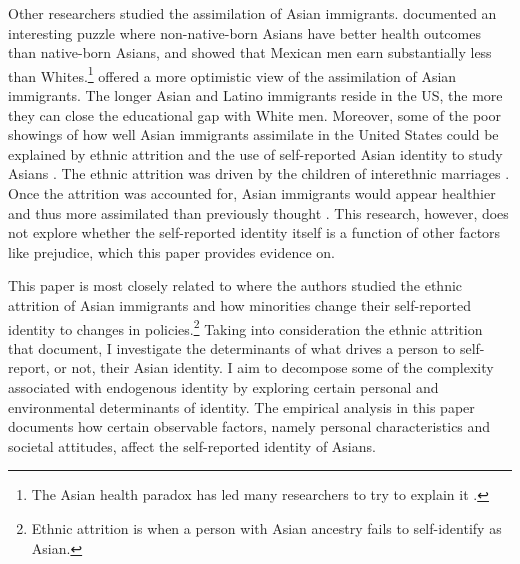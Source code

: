 Other researchers studied the assimilation of Asian immigrants. \textcite{antecolUnhealthyAssimilationWhy2006} documented an interesting puzzle where non-native-born Asians have better health outcomes than native-born Asians, and \textcite{trejoWhyMexicanAmericans1997} showed that Mexican men earn substantially less than Whites.\footnote{The Asian health paradox has led many researchers to try to explain it \autocite{giuntellaAssimilationHealthEvidence2016,giuntellaAccelerationImmigrantUnhealthy2017,giuntellaReasonImmigrationImmigrants2018,giuntellaWhyDoesHealth2017a,antmanEthnicAttritionObserved2016,antmanEthnicAttritionAssimilation2020}.} \textcite{smithAssimilationLatinoGenerations2003} offered a more optimistic view of the assimilation of Asian immigrants. The longer Asian and Latino immigrants reside in the US, the more they can close the educational gap with White men. Moreover, some of the poor showings of how well Asian immigrants assimilate in the United States could be explained by ethnic attrition and the use of self-reported Asian identity to study Asians \autocite{duncanComplexityImmigrantGenerations2017,duncanWhoRemainsMexican2011,mengIntermarriageEconomicAssimilation2005,duncanIdentifyingLaterGenerationDescendants2018,duncanSocioeconomicIntegrationImmigrant2018,antmanEthnicAttritionObserved2016,antmanEthnicAttritionAssimilation2020}. The ethnic attrition was driven by the children of interethnic marriages \autocite{mengIntermarriageEconomicAssimilation2005,duncanEthnicIdentificationIntermarriage2005}. Once the attrition was accounted for, Asian immigrants would appear healthier and thus more assimilated than previously thought \autocite{antmanEthnicAttritionObserved2016,antmanEthnicAttritionAssimilation2020}. This research, however, does not explore whether the self-reported identity itself is a function of other factors like prejudice, which this paper provides evidence on. 

This paper is most closely related to \textcite{antmanEthnicAttritionObserved2016,antmanIncentivesIdentifyRacial2015,antmanAmericanIndianCasinos2021} where the authors studied the ethnic attrition of Asian immigrants and how minorities change their self-reported identity to changes in policies.\footnote{Ethnic attrition is when a person with Asian ancestry fails to self-identify as Asian.} Taking into consideration the ethnic attrition that \textcite{antmanEthnicAttritionObserved2016} document, I investigate the determinants of what drives a person to self-report, or not, their Asian identity. I aim to decompose some of the complexity associated with endogenous identity by exploring certain personal and environmental determinants of identity. The empirical analysis in this paper documents how certain observable factors, namely personal characteristics and societal attitudes, affect the self-reported identity of Asians.

